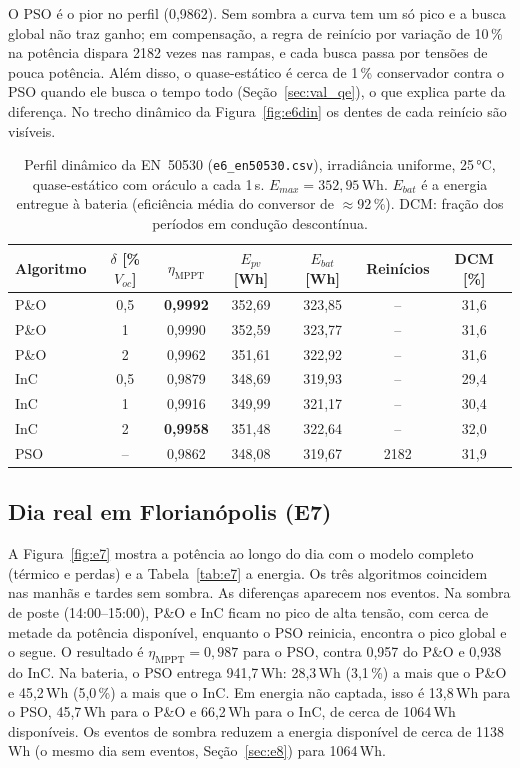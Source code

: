 \documentclass[3p,authoryear]{elsarticle}
\newcommand{\etaM}{\eta_{\mathrm{MPPT}}}
\begin{document}
O PSO é o pior no perfil (0,9862). Sem sombra a curva tem um só pico e a busca global não
traz ganho; em compensação, a regra de reinício por variação de 10\,\% na potência dispara
2182 vezes nas rampas, e cada busca passa por tensões de pouca potência. Além disso, o
quase-estático é cerca de 1\,\% conservador contra o PSO quando ele busca o tempo todo
(Seção~\ref{sec:val_qe}), o que explica parte da diferença. No trecho dinâmico da
Figura~\ref{fig:e6din} os dentes de cada reinício são visíveis.

\begin{table}[!htbp]
\centering\small
\begin{tabular}{lcccccc}
\toprule
Algoritmo & $\delta$ [\% $V_{oc}$] & $\etaM$ & $E_{pv}$ [Wh] & $E_{bat}$ [Wh] & Reinícios &
DCM [\%] \\
\midrule
P\&O & 0,5 & \textbf{0,9992} & 352,69 & 323,85 & -- & 31,6 \\
P\&O & 1   & 0,9990 & 352,59 & 323,77 & -- & 31,6 \\
P\&O & 2   & 0,9962 & 351,61 & 322,92 & -- & 31,6 \\
InC  & 0,5 & 0,9879 & 348,69 & 319,93 & -- & 29,4 \\
InC  & 1   & 0,9916 & 349,99 & 321,17 & -- & 30,4 \\
InC  & 2   & \textbf{0,9958} & 351,48 & 322,64 & -- & 32,0 \\
PSO  & --  & 0,9862 & 348,08 & 319,67 & 2182 & 31,9 \\
\bottomrule
\end{tabular}
\caption{Perfil dinâmico da EN~50530 (\texttt{e6\_en50530.csv}), irradiância uniforme,
25\,°C, quase-estático com oráculo a cada 1\,s. $E_{max} = 352{,}95$\,Wh. $E_{bat}$ é a
energia entregue à bateria (eficiência média do conversor de $\approx$92\,\%). DCM: fração dos
períodos em condução descontínua.}
\label{tab:e6}
\end{table}

\subsection{Dia real em Florianópolis (E7)}

A Figura~\ref{fig:e7} mostra a potência ao longo do dia com o modelo completo (térmico e
perdas) e a Tabela~\ref{tab:e7} a energia. Os três algoritmos coincidem nas manhãs e tardes
sem sombra. As diferenças aparecem nos eventos. Na sombra de poste (14:00--15:00), P\&O e InC
ficam no pico de alta tensão, com cerca de metade da potência disponível, enquanto o PSO
reinicia, encontra o pico global e o segue. O resultado é $\etaM = 0{,}987$ para o PSO,
contra 0,957 do P\&O e 0,938 do InC. Na bateria, o PSO entrega 941,7\,Wh: 28,3\,Wh (3,1\,\%)
a mais que o P\&O e 45,2\,Wh (5,0\,\%) a mais que o InC. Em energia não captada, isso é
13,8\,Wh para o PSO, 45,7\,Wh para o P\&O e 66,2\,Wh para o InC, de cerca de 1064\,Wh
disponíveis. Os eventos de sombra reduzem a energia disponível de cerca de 1138\,Wh (o
mesmo dia sem eventos, Seção~\ref{sec:e8}) para 1064\,Wh.
\end{document}
